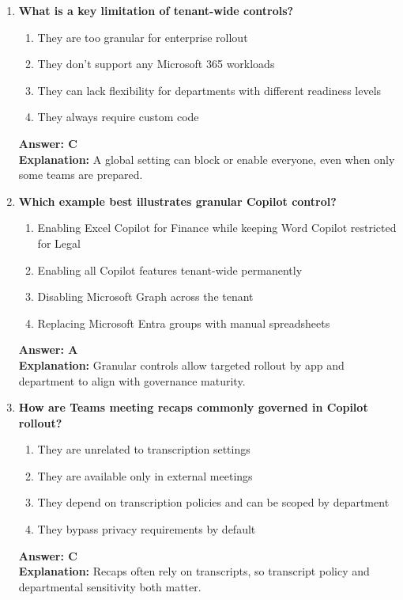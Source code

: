 \documentclass[10pt]{article}
\begin{document}
\begin{enumerate}[leftmargin=*]
\item \textbf{What is a key limitation of tenant-wide controls?}
\begin{enumerate}[label=\Alph*.]
  \item They are too granular for enterprise rollout
  \item They don’t support any Microsoft 365 workloads
  \item They can lack flexibility for departments with different readiness levels
  \item They always require custom code
\end{enumerate}
\textbf{Answer: C}\\
\textbf{Explanation:} A global setting can block or enable everyone, even when only some teams are prepared.

\item \textbf{Which example best illustrates granular Copilot control?}
\begin{enumerate}[label=\Alph*.]
  \item Enabling Excel Copilot for Finance while keeping Word Copilot restricted for Legal
  \item Enabling all Copilot features tenant-wide permanently
  \item Disabling Microsoft Graph across the tenant
  \item Replacing Microsoft Entra groups with manual spreadsheets
\end{enumerate}
\textbf{Answer: A}\\
\textbf{Explanation:} Granular controls allow targeted rollout by app and department to align with governance maturity.

\item \textbf{How are Teams meeting recaps commonly governed in Copilot rollout?}
\begin{enumerate}[label=\Alph*.]
  \item They are unrelated to transcription settings
  \item They are available only in external meetings
  \item They depend on transcription policies and can be scoped by department
  \item They bypass privacy requirements by default
\end{enumerate}
\textbf{Answer: C}\\
\textbf{Explanation:} Recaps often rely on transcripts, so transcript policy and departmental sensitivity both matter.


\end{enumerate}
\end{document}
